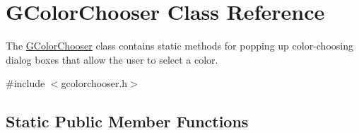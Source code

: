 \hypertarget{classsgl_1_1GColorChooser}{}\section{G\+Color\+Chooser Class Reference}
\label{classsgl_1_1GColorChooser}


The \mbox{\hyperlink{classsgl_1_1GColorChooser}{G\+Color\+Chooser}} class contains static methods for popping up color-\/choosing dialog boxes that allow the user to select a color.  




{\ttfamily \#include $<$gcolorchooser.\+h$>$}

\subsection*{Static Public Member Functions}
